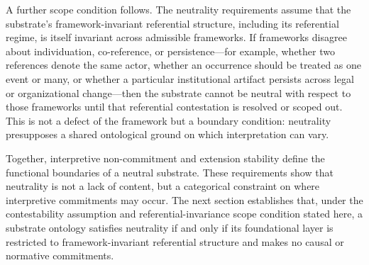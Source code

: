 A further scope condition follows.
The neutrality requirements assume that the substrate's
framework-invariant referential structure, including its
referential regime, is itself invariant across admissible frameworks.
If frameworks disagree about
individuation, co-reference, or persistence---for example,
whether two references denote the same actor,
whether an occurrence should be treated as one event or many,
or whether a particular institutional artifact persists
across legal or organizational change---then
the substrate cannot be neutral with respect to those frameworks
until that referential contestation is resolved or scoped out.
This is not a defect of the framework but a boundary condition:
neutrality presupposes a shared ontological ground on which interpretation can vary.

Together, interpretive non-commitment and extension stability
define the functional boundaries of a neutral substrate.
These requirements show that neutrality is not a lack of content,
but a categorical constraint on where interpretive commitments may occur.
The next section establishes that,
under the contestability assumption and referential-invariance
scope condition stated here,
a substrate ontology satisfies neutrality if and only if
its foundational layer is restricted to framework-invariant
referential structure and makes no causal or normative commitments.
